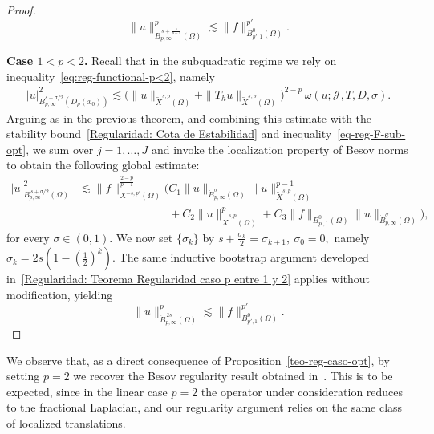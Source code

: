 \documentclass[]{amsart}
\theoremstyle{definition}
\theoremstyle{definition}
\theoremstyle{remark}
\numberwithin{equation}{section}
\begin{document}
\begin{proof}
\[
\|u\|_{\dot{B}_{p, \infty}^{\,s + \frac{s}{p-1}}(\Omega)}^p 
\lesssim 
\|f\|_{B^{0}_{p',1}(\Omega)}^{p'}.
\]

\textbf{Case \(1 < p < 2\).}
Recall that in the subquadratic regime we rely on inequality~\eqref{eq:reg-functional-p<2}, namely
\[
\begin{aligned}
	|u|_{B_{p,\infty}^{s+\sigma/2}(D_\rho(x_0))}^{2} 
	\lesssim 
	\bigl(\|u\|_{\widetilde{X}^{s,p}(\Omega)} + \|T_h u\|_{\widetilde{X}^{s,p}(\Omega)}\bigr)^{2-p}
	\,\omega(u; \mathcal{J}, T, D, \sigma).
\end{aligned}
\]
Arguing as in the previous theorem, and combining this estimate with the stability bound~\eqref{Regularidad: Cota de Estabilidad} and inequality~\eqref{eq-reg-F-sub-opt}, we sum over \(j = 1, \ldots, J\) and invoke the localization property of Besov norms to obtain the following global estimate:
\begin{align*}
	|u|_{B_{p,\infty}^{\,s+\sigma/2}(\Omega)}^{2} 
	&\lesssim 
	\|f\|_{X^{-s,p'}(\Omega)}^{\frac{2-p}{p-1}} 
	\Bigg(
	C_1 \|u\|_{\dot{B}^{\sigma}_{p,\infty}(\Omega)} 
	\|u\|^{p-1}_{\widetilde{X}^{s,p}(\Omega)}  \\
	&\hspace{8em}
	+ C_2 \|u\|^{p}_{\widetilde{X}^{s,p}(\Omega)} 
	+ C_3 \|f\|_{B_{p^{\prime},1}^{0}(\Omega)} 
	\|u\|_{\dot{B}_{p,\infty}^{\sigma}(\Omega)} 
	\Bigg),
\end{align*}
for every \(\sigma \in (0,1)\). 
We now set \(\{\sigma_k\}\) by
$	s + \frac{\sigma_k}{2} = \sigma_{k+1},
 \	\sigma_0 = 0, $
namely
\(
\sigma_k = 2s \left( 1 - \left(\tfrac{1}{2}\right)^k \right).
\)
The same inductive bootstrap argument developed in~\eqref{Regularidad: Teorema Regularidad caso p entre 1 y 2} applies without modification, yielding
\[
\|u\|_{\dot{B}_{p, \infty}^{\,2s }(\Omega)}^p 
\lesssim 
\|f\|_{B^{0}_{p',1}(\Omega)}^{p'}.
\]

	\end{proof}

    
	We observe that, as a direct consequence of Proposition~\ref{teo-reg-caso-opt}, by setting \(p = 2\) we recover the Besov regularity result obtained  in~\cite{borthagaray2023besov}. 
	This is to be expected, since in the linear case \(p=2\) the operator under consideration reduces to the fractional Laplacian, and our regularity argument relies on the same class of localized translations.
\end{document}
